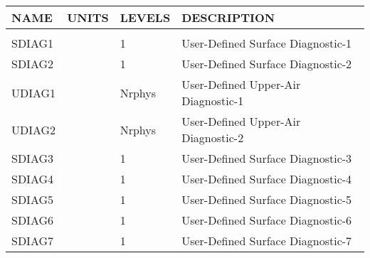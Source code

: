 \begin{tabular}{llll}
\hline\hline
 NAME & UNITS & LEVELS & DESCRIPTION \\
\hline

&\\
 SDIAG1   &             &    1  
         &\begin{minipage}[t]{3in}
          {User-Defined Surface Diagnostic-1} 
         \end{minipage}\\
 SDIAG2   &             &    1  
         &\begin{minipage}[t]{3in}
          {User-Defined Surface Diagnostic-2} 
         \end{minipage}\\
 UDIAG1   &             &    Nrphys
         &\begin{minipage}[t]{3in}
          {User-Defined Upper-Air Diagnostic-1} 
         \end{minipage}\\
 UDIAG2   &             &    Nrphys
         &\begin{minipage}[t]{3in}
          {User-Defined Upper-Air Diagnostic-2} 
         \end{minipage}\\
 SDIAG3   &             &    1  
         &\begin{minipage}[t]{3in}
          {User-Defined Surface Diagnostic-3} 
         \end{minipage}\\
 SDIAG4   &             &    1  
         &\begin{minipage}[t]{3in}
          {User-Defined Surface Diagnostic-4} 
         \end{minipage}\\
 SDIAG5   &             &    1  
         &\begin{minipage}[t]{3in}
          {User-Defined Surface Diagnostic-5} 
         \end{minipage}\\
 SDIAG6   &             &    1  
         &\begin{minipage}[t]{3in}
          {User-Defined Surface Diagnostic-6} 
         \end{minipage}\\
 SDIAG7   &             &    1  
         &\begin{minipage}[t]{3in}
          {User-Defined Surface Diagnostic-7} 
         \end{minipage}\\

\end{tabular}
